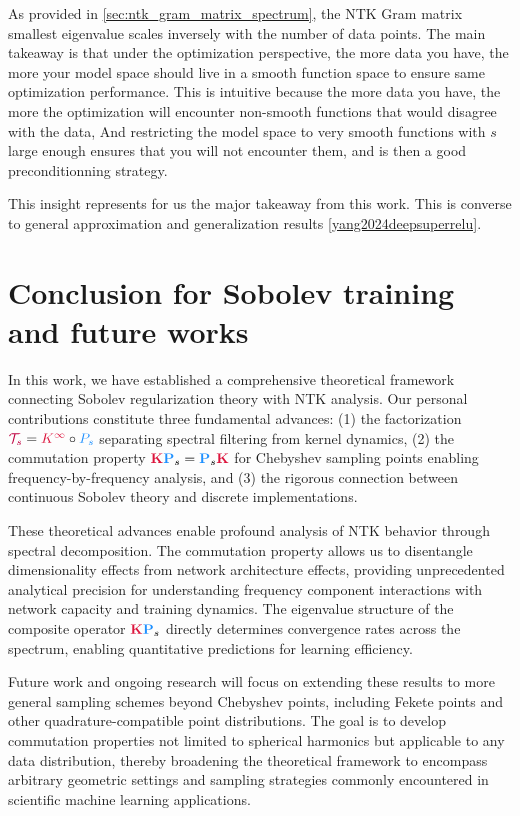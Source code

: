 \documentclass[a4paper]{article}
\newcommand{\Kop}{\textcolor{kernelcolor}{\mathbf{K}}}
\newcommand{\Pop}{\textcolor{sobolevcolor}{\mathbf{P}}}
\newcommand{\Kinf}{\textcolor{kernelcolor}{K^{\infty}}}
\newcommand{\Ps}{\textcolor{sobolevcolor}{P_s}}
\newcommand{\Ts}{\textcolor{purple}{\mathcal{T}_s}}
\theoremstyle{plain}
\theoremstyle{definition}
\theoremstyle{remark}
\newcommand{\Kop}{\textcolor{kernelcolor}{\mathbf{K}}}
\newcommand{\Pop}{\textcolor{sobolevcolor}{\mathbf{P}}}
\newcommand{\Kinf}{\textcolor{kernelcolor}{K^{\infty}}}
\newcommand{\Ps}{\textcolor{sobolevcolor}{P_s}}
\newcommand{\Ts}{\mathcal{T}_s}
\begin{document}
\begin{tcolorbox}[colback=red!10,colframe=red!60!black,title={\textbf{Final takeaway on the result}},enhanced,drop shadow]
    As provided in \ref{sec:ntk_gram_matrix_spectrum}, 
    the NTK Gram matrix smallest eigenvalue scales inversely with the number of data points.
    The main takeaway is that under the optimization perspective, the more data you have, the more your model space should
    live in a smooth function space to ensure same optimization performance. This is intuitive because
    the more data you have, the more the optimization will encounter non-smooth functions that would disagree with the data,
    And restricting the model space to very smooth functions with $s$ large enough ensures that you will not encounter them,
    and is then a good preconditionning strategy.

    This insight represents for us the major takeaway from this work.
    This is converse to general approximation and generalization results \ref{yang2024deepsuperrelu}.

\end{tcolorbox}




\newpage
\section{Conclusion for Sobolev training and future works}
In this work, we have established a comprehensive theoretical framework connecting Sobolev regularization theory with NTK analysis. Our personal contributions constitute three fundamental advances: (1) the factorization $\Ts = \Kinf \circ \Ps$ separating spectral filtering from kernel dynamics, (2) the commutation property $\Kop \Pop_s = \Pop_s \Kop$ for Chebyshev sampling points enabling frequency-by-frequency analysis, and (3) the rigorous connection between continuous Sobolev theory and discrete implementations.

These theoretical advances enable profound analysis of NTK behavior through spectral decomposition. The commutation property allows us to disentangle dimensionality effects from network architecture effects, providing unprecedented analytical precision for understanding frequency component interactions with network capacity and training dynamics. The eigenvalue structure of the composite operator $\Kop\Pop_s$ directly determines convergence rates across the spectrum, enabling quantitative predictions for learning efficiency.

Future work and ongoing research will focus on extending these results to more general sampling schemes beyond Chebyshev points, including Fekete points and other quadrature-compatible point distributions. The goal is to develop commutation properties not limited to spherical harmonics but applicable to any data distribution, thereby broadening the theoretical framework to encompass arbitrary geometric settings and sampling strategies commonly encountered in scientific machine learning applications.
\end{document}
